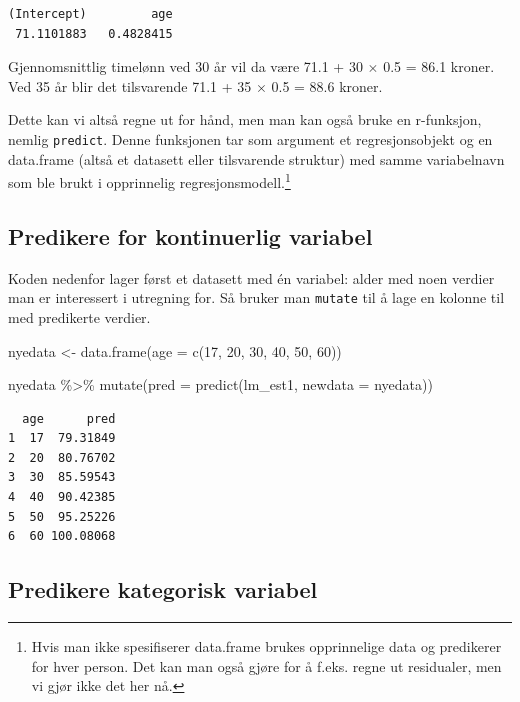 \documentclass[
  norsk,
  letterpaper,
  DIV=11,
  numbers=noendperiod]{scrreprt}
\newenvironment{Shaded}{\begin{snugshade}}{\end{snugshade}}
\newcommand{\AttributeTok}[1]{\textcolor[rgb]{0.40,0.45,0.13}{#1}}
\newcommand{\DecValTok}[1]{\textcolor[rgb]{0.68,0.00,0.00}{#1}}
\newcommand{\FunctionTok}[1]{\textcolor[rgb]{0.28,0.35,0.67}{#1}}
\newcommand{\NormalTok}[1]{\textcolor[rgb]{0.00,0.23,0.31}{#1}}
\newcommand{\OtherTok}[1]{\textcolor[rgb]{0.00,0.23,0.31}{#1}}
\newcommand{\SpecialCharTok}[1]{\textcolor[rgb]{0.37,0.37,0.37}{#1}}
\theoremstyle{definition}
\theoremstyle{remark}
\begin{document}
\begin{verbatim}
(Intercept)         age 
 71.1101883   0.4828415 
\end{verbatim}

Gjennomsnittlig timelønn ved 30 år vil da være 71.1 + 30 \(\times\) 0.5
= 86.1 kroner. Ved 35 år blir det tilsvarende 71.1 + 35 \(\times\) 0.5 =
88.6 kroner.

Dette kan vi altså regne ut for hånd, men man kan også bruke en
r-funksjon, nemlig \texttt{predict}. Denne funksjonen tar som argument
et regresjonsobjekt og en data.frame (altså et datasett eller
tilsvarende struktur) med samme variabelnavn som ble brukt i opprinnelig
regresjonsmodell.\footnote{Hvis man ikke spesifiserer data.frame brukes
  opprinnelige data og predikerer for hver person. Det kan man også
  gjøre for å f.eks. regne ut residualer, men vi gjør ikke det her nå.}

\subsection{Predikere for kontinuerlig
variabel}\label{predikere-for-kontinuerlig-variabel}

Koden nedenfor lager først et datasett med én variabel: alder med noen
verdier man er interessert i utregning for. Så bruker man
\texttt{mutate} til å lage en kolonne til med predikerte verdier.

\begin{Shaded}
\begin{Highlighting}[]
\NormalTok{nyedata }\OtherTok{\textless{}{-}} \FunctionTok{data.frame}\NormalTok{(}\AttributeTok{age =} \FunctionTok{c}\NormalTok{(}\DecValTok{17}\NormalTok{, }\DecValTok{20}\NormalTok{, }\DecValTok{30}\NormalTok{, }\DecValTok{40}\NormalTok{, }\DecValTok{50}\NormalTok{, }\DecValTok{60}\NormalTok{))}

\NormalTok{nyedata }\SpecialCharTok{\%\textgreater{}\%} 
  \FunctionTok{mutate}\NormalTok{(}\AttributeTok{pred =} \FunctionTok{predict}\NormalTok{(lm\_est1, }\AttributeTok{newdata =}\NormalTok{ nyedata))}
\end{Highlighting}
\end{Shaded}

\begin{verbatim}
  age      pred
1  17  79.31849
2  20  80.76702
3  30  85.59543
4  40  90.42385
5  50  95.25226
6  60 100.08068
\end{verbatim}

\subsection{Predikere kategorisk
variabel}\label{predikere-kategorisk-variabel}
\end{document}
